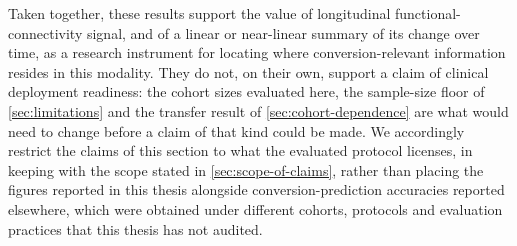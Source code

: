 Taken together, these results support the value of longitudinal functional-connectivity
signal, and of a linear or near-linear summary of its change over time, as a research
instrument for locating where conversion-relevant information resides in this modality.
They do not, on their own, support a claim of clinical deployment readiness: the cohort
sizes evaluated here, the sample-size floor of \autoref{sec:limitations} and the transfer result
of \autoref{sec:cohort-dependence} are what would need to change before a claim of that kind
could be made. We accordingly restrict the claims of this section to what the evaluated
protocol licenses, in keeping with the scope stated in \autoref{sec:scope-of-claims}, rather
than placing the figures reported in this thesis alongside conversion-prediction accuracies
reported elsewhere, which were obtained under different cohorts, protocols and evaluation
practices that this thesis has not audited.
